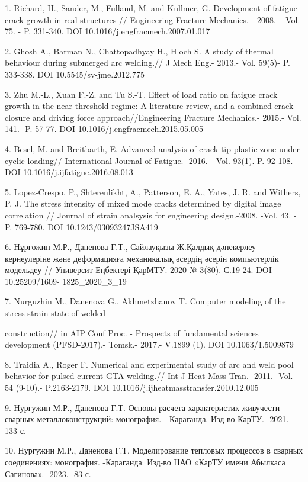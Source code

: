 \begin{noparindent}
1. Richard, H., Sander, M., Fulland, M. and Kullmer, G. Development of
fatigue crack growth in real structures // Engineering Fracture
Mechanics. - 2008. -- Vol. 75. - P. 331-340. DOI
10.1016/j.engfracmech.2007.01.017

2. Ghosh A., Barman N., Chattopadhyay H., Hloch S. A study of thermal
behaviour during submerged arc welding.// J Mech Eng.- 2013.- Vol.
59(5)- P. 333-338. DOI 10.5545/sv-jme.2012.775

3. Zhu M.-L., Xuan F.-Z. and Tu S.-T. Effect of load ratio on fatigue
crack growth in the near-threshold regime: A literature review, and a
combined crack closure and driving force approach//Engineering Fracture
Mechanics.- 2015.- Vol. 141.- P. 57-77. DOI
10.1016/j.engfracmech.2015.05.005

4. Besel, M. and Breitbarth, E. Advanced analysis of crack tip plastic
zone under cyclic loading// International Journal of Fatigue. -2016. -
Vol. 93(1).-P. 92-108. DOI 10.1016/j.ijfatigue.2016.08.013

5. Lopez-Crespo, P., Shterenlikht, A., Patterson, E. A., Yates, J. R.
and Withers, P. J. The stress intensity of mixed mode cracks determined
by digital image correlation // Journal of strain analsysis for
engineering design.-2008. -Vol. 43. - P. 769-780. DOI
10.1243/03093247JSA419

6. Нұрғожин М.Р., Даненова Г.Т., Сайлауқызы Ж.Қалдық дәнекерлеу
кернеулеріне және деформацияға механикалық әсердің әсерін компьютерлік
модельдеу // Университ Еңбектері ҚарМТУ.-2020-№ 3(80).-С.19-24. DOI
10.25209/1609- 1825\_2020\_3\_19

7. Nurguzhin M., Danenova G., Akhmetzhanov T. Computer modeling of the
stress-strain state of welded

construction// in AIP Conf Proc. -
Prospects of fundamental sciences development (PFSD-2017).- Tomsk.-
2017.- V.1899 (1). DOI 10.1063/1.5009879

8. Traidia A., Roger F. Numerical and experimental study of arc and weld
pool behavior for pulsed current GTA welding.// Int J Heat Mass Tran.-
2011.- Vol. 54 (9-10).- P.2163-2179. DOI
10.1016/j.ijheatmasstransfer.2010.12.005

9. Нургужин М.Р., Даненова Г.Т. Основы расчета характеристик живучести
сварных металлоконструкций: монография. - Караганда. Изд-во КарТУ.-
2021.- 133 с.

10. Нургужин М.Р., Даненова Г.Т. Моделирование тепловых процессов в
сварных соединениях: монография. -Караганда: Изд-во НАО «КарТУ имени
Абылкаса Сагинова».- 2023.- 83 с.
\end{noparindent}


